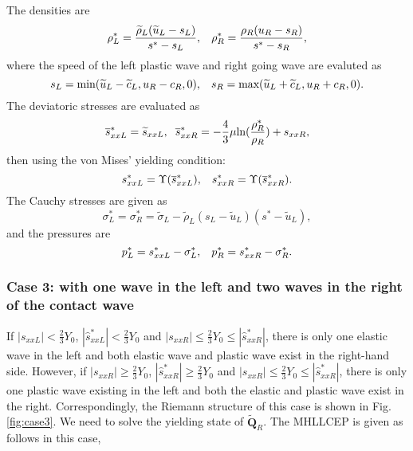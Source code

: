 \documentclass[review]{elsarticle}
\begin{document}
The densities are
\begin{equation}
  \rho_L^* = \frac{\widetilde{\rho}_L(\widetilde{u}_L-s_L)}{s^*-s_L}, \hspace{0.3cm}  \rho_R^* = \frac{\rho_R(u_R-s_R)}{s^*-s_R},
\end{equation}
where  the speed of the  left  plastic wave and right going wave are evaluted as
    \begin{equation}
      s_L = \text{min} (\widetilde{u}_L-\widetilde{c}_L, u_R-c_R, 0), \hspace{0.3cm} s_R = \text{max}(\widetilde{u}_L+\widetilde{c}_L, u_R+c_R, 0).
    \end{equation}
The deviatoric stresses are evaluated as
\begin{equation}
  \overline{s}_{xxL}^*= \widetilde{s}_{xxL},\hspace{0.2cm}  \overline{s}_{xxR}^*=-\frac{4}{3}\mu\text{ln}(\frac{\rho_R^*}{\rho_R})+s_{xxR},
\end{equation}
then using  the von Mises' yielding condition:
\begin{equation}
  s_{xxL}^* = \Upsilon(\overline{s}_{xxL}^*), \hspace{0.3cm}  s_{xxR}^* = \Upsilon(\overline{s}_{xxR}^*).
\end{equation}
The Cauchy stresses are given as
\begin{equation}
  \sigma_L^*=\sigma_R^*=\widetilde{\sigma}_L -\widetilde{\rho}_L (s_L-\widetilde{u}_L)(s^*-\widetilde{u}_L),
\end{equation}
and the pressures are
\begin{equation}
  p_L^* = s_{xxL}^* - \sigma_L^*, \hspace{0.3cm}   p_R^* = s_{xxR}^* - \sigma_R^*.
\end{equation}
\subsubsection {Case 3: with one wave in the left and two  waves in the right of the contact wave}\label{sec:case3}
If  $|s_{xxL}|<\frac{2}{3}Y_0$, $|\hat{s}_{xxL}^*| < \frac{2}{3}Y_0$  and $|s_{xxR}| \le \frac{2}{3}Y_0 \le  |\hat{s}_{xxR}^*|$, there is only one elastic wave in the left and both elastic wave and plastic wave exist in the right-hand side. However, if  $|s_{xxR}|\geq \frac{2}{3}Y_0$, $|\hat{s}_{xxR}^*| \geq \frac{2}{3}Y_0$  and $|s_{xxR}| \le \frac{2}{3}Y_0 \le  |\hat{s}_{xxR}^*|$,  there is only one plastic wave existing in the left and both the elastic and plastic wave exist in the right. Correspondingly, the Riemann structure of this case is shown in Fig.\ref{fig:case3}. We need to solve the yielding state of $\widetilde{\mathbf{Q}}_R$. The MHLLCEP is given as follows in this case,
\end{document}
